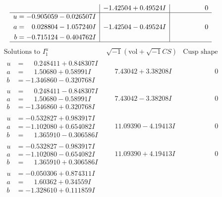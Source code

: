 \documentclass[1p]{elsarticle_modified}
\theoremstyle{definition}
\newcommand{\I}{\sqrt{-1}}
\begin{document}
$$\begin{array}{c|c|c}
 & -1.42504 + 0.49524 I & \phantom{-0.000000 } 0 \\ \hline\begin{aligned}
u &= -0.905059 - 0.026507 I \\
a &= \phantom{-}0.028804 - 1.057240 I \\
b &= -0.715124 - 0.404762 I\end{aligned}
 & -1.42504 - 0.49524 I & \phantom{-0.000000 } 0\\
 \hline 
 \end{array}$$\newpage$$\begin{array}{c|c|c}  
\text{Solutions to }I^u_{1}& \I (\text{vol} + \sqrt{-1}CS) & \text{Cusp shape}\\
 \hline 
\begin{aligned}
u &= \phantom{-}0.248411 + 0.848307 I \\
a &= \phantom{-}1.50680 + 0.58991 I \\
b &= -1.346860 - 0.320768 I\end{aligned}
 & \phantom{-}7.43042 + 3.38208 I & \phantom{-0.000000 } 0 \\ \hline\begin{aligned}
u &= \phantom{-}0.248411 - 0.848307 I \\
a &= \phantom{-}1.50680 - 0.58991 I \\
b &= -1.346860 + 0.320768 I\end{aligned}
 & \phantom{-}7.43042 - 3.38208 I & \phantom{-0.000000 } 0 \\ \hline\begin{aligned}
u &= -0.532827 + 0.983917 I \\
a &= -1.102080 + 0.654082 I \\
b &= \phantom{-}1.365910 - 0.306586 I\end{aligned}
 & \phantom{-}11.09390 - 4.19413 I & \phantom{-0.000000 } 0 \\ \hline\begin{aligned}
u &= -0.532827 - 0.983917 I \\
a &= -1.102080 - 0.654082 I \\
b &= \phantom{-}1.365910 + 0.306586 I\end{aligned}
 & \phantom{-}11.09390 + 4.19413 I & \phantom{-0.000000 } 0 \\ \hline\begin{aligned}
u &= -0.050306 + 0.874311 I \\
a &= \phantom{-}1.60362 + 0.34559 I \\
b &= -1.328610 + 0.111859 I\end{aligned}

\end{array}$$
\end{document}
